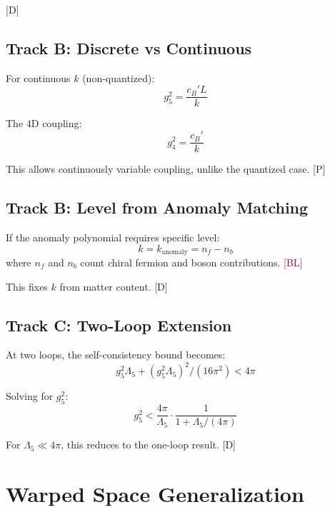 \documentclass[11pt,a4paper]{article}
\newcommand{\tagD}{\textcolor{blue!70!black}{[D]}}
\newcommand{\tagP}{\textcolor{green!50!black}{[P]}}
\newcommand{\tagBL}{\textcolor{purple}{[BL]}}
\begin{document}
\tagD

\subsection{Track B: Discrete vs Continuous}

For continuous $k$ (non-quantized):
\begin{equation}
\label{eq:app-cont-k}
g_5^2 = \frac{c_B' L}{k}
\end{equation}

The 4D coupling:
\begin{equation}
\label{eq:app-g4-cont}
g_4^2 = \frac{c_B'}{k}
\end{equation}

This allows continuously variable coupling, unlike the quantized case. \tagP

\subsection{Track B: Level from Anomaly Matching}

If the anomaly polynomial requires specific level:
\begin{equation}
\label{eq:app-anomaly-k}
k = k_{\text{anomaly}} = n_f - n_b
\end{equation}
where $n_f$ and $n_b$ count chiral fermion and boson contributions. \tagBL

This fixes $k$ from matter content. \tagD

\subsection{Track C: Two-Loop Extension}

At two loops, the self-consistency bound becomes:
\begin{equation}
\label{eq:app-2loop}
g_5^2 \Lambda_5 + (g_5^2 \Lambda_5)^2 / (16\pi^2) < 4\pi
\end{equation}

Solving for $g_5^2$:
\begin{equation}
\label{eq:app-g5-2loop}
g_5^2 < \frac{4\pi}{\Lambda_5} \cdot \frac{1}{1 + \Lambda_5/(4\pi)}
\end{equation}

For $\Lambda_5 \ll 4\pi$, this reduces to the one-loop result. \tagD

\section{Warped Space Generalization}
\label{app:warped}
\end{document}
